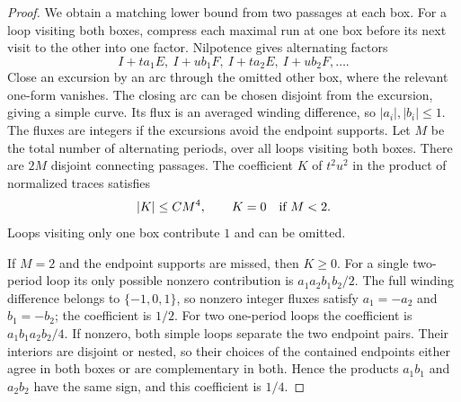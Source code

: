 \begin{proof}
We obtain a matching lower bound from two passages at each box.
For a loop visiting both boxes, compress each maximal run at one box
before its next visit to the other into one factor.  Nilpotence gives
alternating factors
\[
 I+ta_1E,\ I+ub_1F,\ I+ta_2E,\ I+ub_2F,\ldots.
\]
Close an excursion by an arc through the omitted other box,
where the relevant one-form vanishes.  The closing arc can be chosen
disjoint from the excursion, giving a simple curve.  Its flux is an
averaged winding difference, so $|a_i|,|b_i|
\le1$.  The fluxes are integers if the excursions avoid the endpoint
supports.  Let $M$ be the total number of alternating periods, over
all loops visiting both boxes.  There are $2M$ disjoint connecting
passages.  The coefficient $K$ of $t^2u^2$ in the product of normalized
traces satisfies
\begin{equation}\label{q4field:coefficient-bound}
 |K|\le C M^4,\qquad K=0\quad\hbox{if }M<2.
\end{equation}
Loops visiting only one box contribute $1$ and can be omitted.

If $M=2$ and the endpoint supports are missed, then $K\ge0$.
For a single two-period loop its only possible nonzero contribution is
$a_1a_2b_1b_2/2$.  The full winding difference belongs to
$\{-1,0,1\}$, so nonzero integer fluxes satisfy
$a_1=-a_2$ and $b_1=-b_2$; the coefficient is $1/2$.
For two one-period loops the coefficient is
$a_1b_1a_2b_2/4$.  If nonzero, both simple loops separate the two
endpoint pairs.  Their interiors are disjoint or nested, so their
choices of the contained endpoints either agree in both boxes or are
complementary in both.  Hence the products $a_1b_1$ and $a_2b_2$ have
the same sign, and this coefficient is $1/4$.


\end{proof}
